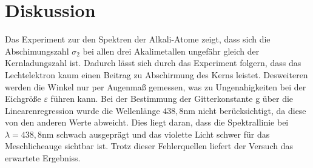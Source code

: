 \section{Diskussion}
\label{sec:Diskussion}
Das Experiment zur den Spektren der
Alkali-Atome zeigt, dass sich die Abschimungszahl
$\sigma_2$ bei allen drei Akalimetallen ungefähr gleich der
Kernladungszahl ist. Dadurch lässt sich durch das Experiment
folgern, dass das Lechtelektron kaum einen Beitrag zu Abschirmung
des Kerns leistet. Desweiteren werden die Winkel nur per Augenmaß gemessen,
was zu Ungenahigkeiten bei der Eichgröße $\varepsilon$ führen kann. Bei der
Bestimmung der Gitterkonstante g über die Linearenregression wurde die
Wellenlänge $438,8\si{\nano\meter}$ nicht berücksichtigt, da
diese von den anderen Werte abweicht. Dies liegt daran, dass
die Spektrallinie bei $\lambda=438,8\si{\nano\meter}$ schwach ausgeprägt
und das violette Licht schwer für das Meschlicheauge sichtbar ist. Trotz
dieser Fehlerquellen liefert der Versuch das erwartete Ergebniss.    
